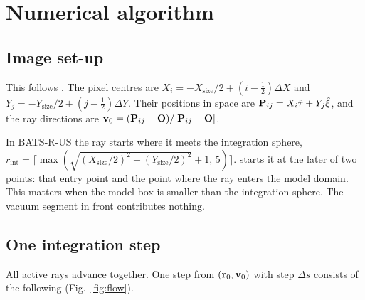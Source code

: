 \chapter{Numerical algorithm}

\section{Image set-up}
This follows . The pixel centres are
$X_i=-X_\text{size}/2+(i-\tfrac12)\Delta X$ and $Y_j=-Y_\text{size}/2+(j-\tfrac12)\Delta Y$.
Their positions in space are $\mathbf{P}_{ij}=X_i\hat\tau+Y_j\hat\xi$, and the ray
directions are $\mathbf{v}_0=(\mathbf{P}_{ij}-\mathbf{O})/|\mathbf{P}_{ij}-\mathbf{O}|$.

In BATS-R-US the ray starts where it meets the integration sphere,
$r_\text{int}=\lceil\max(\sqrt{(X_\text{size}/2)^2+(Y_\text{size}/2)^2}+1,\,5)\rceil$.
 starts it at the later of two points: that entry point and the point
where the ray enters the model domain. This matters when the model box is smaller than
the integration sphere. The vacuum segment in front contributes nothing.

\section{One integration step}
All active rays advance together. One step from $(\mathbf{r}_0,\mathbf{v}_0)$ with step
$\Delta s$ consists of the following (Fig.~\ref{fig:flow}).

